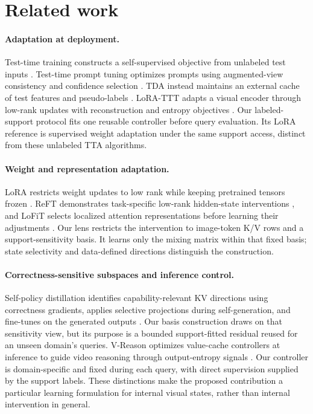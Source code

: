 \documentclass{article}
\begin{document}
\section{Related work}
\label{sec:related}
\paragraph{Adaptation at deployment.}
Test-time training constructs a self-supervised objective from unlabeled test inputs \citep{sun2020ttt}. Test-time prompt tuning optimizes prompts using augmented-view consistency and confidence selection \citep{shu2022tpt}. TDA instead maintains an external cache of test features and pseudo-labels \citep{karmanov2024tda}. LoRA-TTT adapts a visual encoder through low-rank updates with reconstruction and entropy objectives \citep{kojima2025lorattt}. Our labeled-support protocol fits one reusable controller before query evaluation. Its LoRA reference is supervised weight adaptation under the same support access, distinct from these unlabeled TTA algorithms.

\paragraph{Weight and representation adaptation.}
LoRA restricts weight updates to low rank while keeping pretrained tensors frozen \citep{hu2022lora}. ReFT demonstrates task-specific low-rank hidden-state interventions \citep{wu2024reft}, and LoFiT selects localized attention representations before learning their adjustments \citep{yin2024lofit}. Our lens restricts the intervention to image-token K/V rows and a support-sensitivity basis. It learns only the mixing matrix within that fixed basis; state selectivity and data-defined directions distinguish the construction.

\paragraph{Correctness-sensitive subspaces and inference control.}
Self-policy distillation identifies capability-relevant KV directions using correctness gradients, applies selective projections during self-generation, and fine-tunes on the generated outputs \citep{hao2026spd}. Our basis construction draws on that sensitivity view, but its purpose is a bounded support-fitted residual reused for an unseen domain's queries. V-Reason optimizes value-cache controllers at inference to guide video reasoning through output-entropy signals \citep{sridhar2026vreason}. Our controller is domain-specific and fixed during each query, with direct supervision supplied by the support labels. These distinctions make the proposed contribution a particular learning formulation for internal visual states, rather than internal intervention in general.
\end{document}

